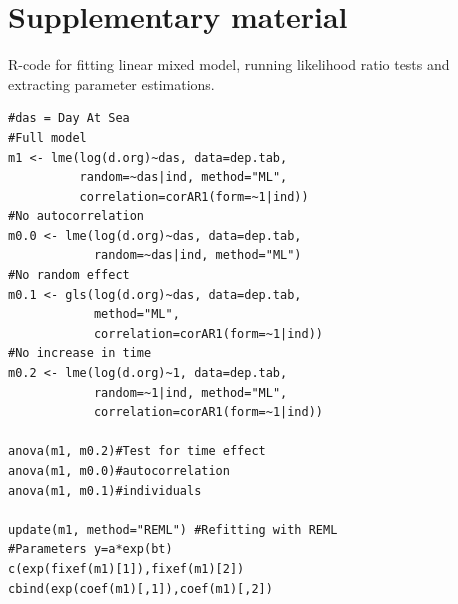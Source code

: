\newpage
\clearpage
\section*{Supplementary material}

\setcounter{figure}{0}

\makeatletter 
\renewcommand{\thefigure}{S\@arabic\c@figure}
\renewcommand{\theprogram}{S\@arabic\c@program}
\makeatother

\begin{program}
\caption{R-code for fitting linear mixed model, running likelihood ratio tests and extracting parameter estimations.}
\begin{verbatim}
#das = Day At Sea
#Full model
m1 <- lme(log(d.org)~das, data=dep.tab,
          random=~das|ind, method="ML",
          correlation=corAR1(form=~1|ind))
#No autocorrelation
m0.0 <- lme(log(d.org)~das, data=dep.tab,
            random=~das|ind, method="ML")
#No random effect
m0.1 <- gls(log(d.org)~das, data=dep.tab,
            method="ML", 
            correlation=corAR1(form=~1|ind))
#No increase in time
m0.2 <- lme(log(d.org)~1, data=dep.tab,
            random=~1|ind, method="ML",
            correlation=corAR1(form=~1|ind))

anova(m1, m0.2)#Test for time effect
anova(m1, m0.0)#autocorrelation
anova(m1, m0.1)#individuals

update(m1, method="REML") #Refitting with REML
#Parameters y=a*exp(bt)
c(exp(fixef(m1)[1]),fixef(m1)[2])
cbind(exp(coef(m1)[,1]),coef(m1)[,2])
\end{verbatim}
\label{code1}
\end{program}

